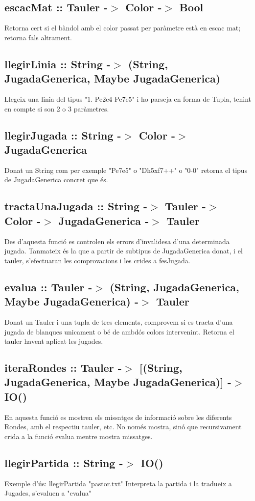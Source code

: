 \documentclass{article}
\begin{document}
\subsection*{escacMat :: Tauler -$>$ Color -$>$ Bool}
Retorna cert si el bàndol amb el color passat per paràmetre està en escac mat;
retorna fals altrament.
\subsection*{llegirLinia :: String -$>$ (String, JugadaGenerica, Maybe JugadaGenerica)}
Llegeix una linia del tipus "1. Pe2e4 Pe7e5" i ho parseja
en forma de Tupla, tenint en compte si son 2 o 3 paràmetres.
\subsection*{llegirJugada :: String -$>$ Color -$>$ JugadaGenerica}
Donat un String com per exemple "Pe7e5" o "Dh5xf7++" o "0-0" 
retorna el tipus de JugadaGenerica concret que és.
\subsection*{tractaUnaJugada :: String -$>$ Tauler -$>$ Color -$>$ JugadaGenerica -$>$ Tauler}
Des d'aquesta funció es controlen els errors d'invalidesa d'una 
determinada jugada. Tanmateix és la que a partir de subtipus de
JugadaGenerica donat, i el tauler, s'efectuaran les comprovacions
i les crides a fesJugada.
\subsection*{evalua :: Tauler -$>$ (String, JugadaGenerica, Maybe JugadaGenerica) -$>$ Tauler}
Donat un Tauler i una tupla de tres elements, comprovem si
es tracta d'una jugada de blanques unicament o bé de ambdós
colors intervenint. Retorna el tauler havent aplicat les jugades. 
\subsection*{iteraRondes :: Tauler -$>$ [(String, JugadaGenerica, Maybe JugadaGenerica)] -$>$ IO()}
En aquesta funció es mostren els missatges de informació sobre 
les diferents Rondes, amb el respectiu tauler, etc. No només mostra,
sinó que recursivament crida a la funció evalua mentre mostra missatges.
\subsection*{llegirPartida :: String -$>$ IO()}
Exemple d'ús: llegirPartida "pastor.txt"
Interpreta la partida i la tradueix a Jugades, s'evaluen a "evalua"
\newpage
\end{document}
